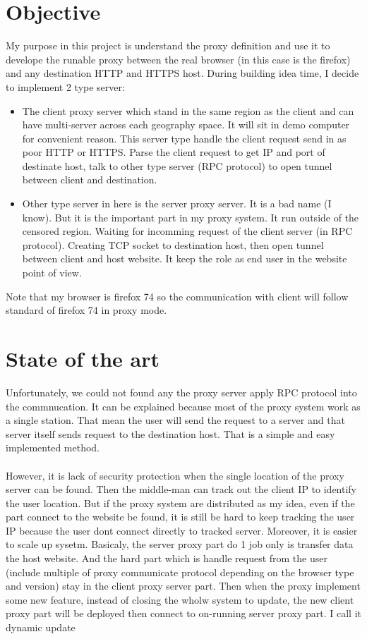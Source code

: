 \documentclass{article}
\begin{document}
\section{Objective}
My purpose in this project is understand the proxy definition
and use it to develope the runable proxy between the real browser
(in this case is the firefox) and any destination HTTP and HTTPS
host. During building idea time, I decide to implement 2 type server:
\begin{itemize}
\item The client proxy server which stand in the same region as
the client and can have multi-server across each geography space.
It will sit in demo computer for convenient reason. This server type
handle the client request send in as poor HTTP or HTTPS. Parse the
client request to get IP and port of destinate host, talk to other
type server (RPC protocol) to open tunnel between client and 
destination.
\item Other type server in here is the server proxy server. 
It is a bad name (I know). But it is the important part in 
my proxy system. It run outside of the censored region. Waiting
for incomming request of the client server (in RPC protocol).
Creating TCP socket to destination host, then open tunnel between
client and host website. It keep the role as end user in the
website point of view.
\end{itemize}
Note that my browser is firefox 74 so the communication with
client will follow standard of firefox 74 in proxy mode.
\section{State of the art}
Unfortunately, we could not found any the proxy server apply
RPC protocol into the commnucation. It can be explained because
most of the proxy system work as a single station. That mean
the user will send the request to a server and that server itself
sends request to the destination host. That is a simple and easy
implemented method.\\
\\
However, it is lack of security protection when the single location
of the proxy server can be found. Then the middle-man can track out
the client IP to identify the user location. But if the proxy system
are distributed as my idea, even if the part connect to the website
be found, it is still be hard to keep tracking the user IP because
the user dont connect directly to tracked server. Moreover, it is
easier to scale up sysetm. Basicaly, the server proxy part do 1 job
only is transfer data the host website. And the hard part which is
handle request from the user (include multiple of proxy communicate
protocol depending on the browser type and version) stay in the client
proxy server part. Then when the proxy implement
some new feature, instead of closing the wholw system to update,
the new client proxy part will be deployed then connect to on-running
server proxy part. I call it dynamic update
\end{document}
